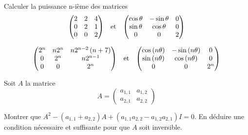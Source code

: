 \documentclass{magnolia}
\begin{document}
Calculer la puissance n-ième des matrices
  \[\begin{pmatrix}
    2 & 2 & 4\\
    0 & 2 & 1\\
    0 & 0 & 2
    \end{pmatrix} \quad\!\text{et}\quad\!
    \begin{pmatrix}
    \cos \theta & -\sin \theta & 0\\
    \sin \theta & \cos \theta & 0\\
    0 & 0 & 2
    \end{pmatrix}\]
\begin{sol}
\[\begin{pmatrix}
  2^n & n2^n & n2^{n-2}\left(n+7\right)\\
  0 & 2^n & n2^{n-1} \\
  0 & 0 & 2^n
  \end{pmatrix} \quad\!\text{et}\quad\!
  \begin{pmatrix}
  \cos\left(n\theta\right) & -\sin\left(n\theta\right) & 0\\
  \sin\left(n\theta\right) & \cos\left(n\theta\right) & 0\\
  0 & 0 & 2^n
  \end{pmatrix}\]
\end{sol}




Soit $A$ la matrice
\[A=\begin{pmatrix}
    a_{1,1} & a_{1,2}\\
    a_{2,1} & a_{2,2}
  \end{pmatrix}\]
\begin{questions}
\question Montrer que $A^2-(a_{1,1}+a_{2,2})A+(a_{1,1}a_{2,2}-a_{1,2}a_{2,1})I=0$.
\question En déduire une condition nécessaire et suffisante pour que $A$ soit
  inversible.
\end{questions}






\end{document}
